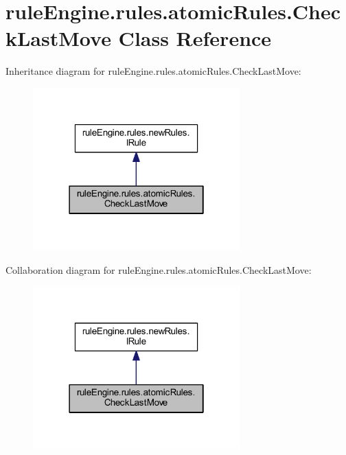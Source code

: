 \hypertarget{classrule_engine_1_1rules_1_1atomic_rules_1_1_check_last_move}{}\section{rule\+Engine.\+rules.\+atomic\+Rules.\+Check\+Last\+Move Class Reference}
\label{classrule_engine_1_1rules_1_1atomic_rules_1_1_check_last_move}


Inheritance diagram for rule\+Engine.\+rules.\+atomic\+Rules.\+Check\+Last\+Move\+:
\nopagebreak
\begin{figure}[H]
\begin{center}
\leavevmode
\includegraphics[width=226pt]{classrule_engine_1_1rules_1_1atomic_rules_1_1_check_last_move__inherit__graph}
\end{center}
\end{figure}


Collaboration diagram for rule\+Engine.\+rules.\+atomic\+Rules.\+Check\+Last\+Move\+:
\nopagebreak
\begin{figure}[H]
\begin{center}
\leavevmode
\includegraphics[width=226pt]{classrule_engine_1_1rules_1_1atomic_rules_1_1_check_last_move__coll__graph}
\end{center}
\end{figure}
